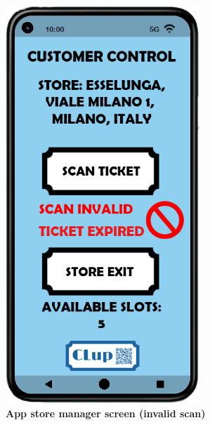 \begin{itemize}
\begin{figure}[!htb]
\begin{minipage}{0.4\textwidth}
\includegraphics[width=0.65\textwidth]{Images/App/Android_InvalidScan}
\captionsetup{justification=centering}
\caption{\label{fig:androidinvalidscan}\textbf {App store manager screen (invalid scan)}}
\end{minipage}
\end{figure}
\end{itemize}


